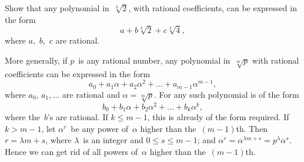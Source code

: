 Show that any polynomial in~$\sqrt[3]{2}$, with rational coefficients, can be
expressed in the form
\[
a + b\sqrt[3]{2} + c\sqrt[3]{4},
\]
where $a$,~$b$,~$c$ are rational.

More generally, if $p$~is any rational number, any polynomial in~$\sqrt[m]{p}$ with
rational coefficients can be expressed in the form
\[
a_{0} + a_{1}\alpha + a_{2}\alpha^{2} + \dots + a_{m-1}\alpha^{m-1},
\]
where $a_{0}$, $a_{1}, \dots$ are rational and $\alpha = \sqrt[m]{p}$. For any such polynomial is of the
form
\[
b_{0} + b_{1}\alpha + b_{2}\alpha^{2} + \dots + b_{k}\alpha^{k},
\]
where the~$b$'s are rational. If $k \leq m - 1$, this is already of the form required. If
$k > m - 1$, let $\alpha^{r}$~be any power of~$\alpha$ higher than the~$(m - 1)$th. Then $r = \lambda m + s$,
where $\lambda$~is an integer and $0 \leq s \leq m - 1$; and $\alpha^{r} = \alpha^{\lambda m + s} = p^{\lambda}\alpha^{s}$. Hence we can
get rid of all powers of~$\alpha$ higher than the~$(m - 1)$th.

